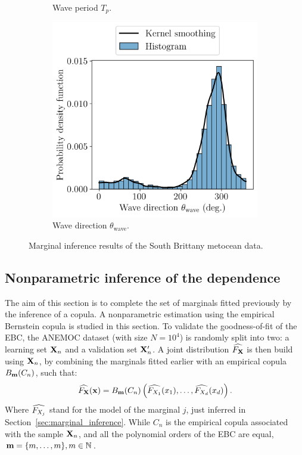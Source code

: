 \begin{figure}
\begin{subfigure}[b]{0.32\textwidth}
        \caption{Wave period $T_p$.}
    \end{subfigure}
    \begin{subfigure}[b]{0.32\textwidth}
        \centering
        \includegraphics[width=\linewidth]{../numerical_experiments/chapter3/figures/wave_dir_distribution_SB.png}
        \caption{Wave direction $\theta_{\mathrm{wave}}$.}
    \end{subfigure}
    \caption{Marginal inference results of the South Brittany metocean data.}
    \label{fig:marginals_sb}
\end{figure}

\newpage
\subsection{Nonparametric inference of the dependence}

The aim of this section is to complete the set of marginals fitted previously by the inference of a copula. 
A nonparametric estimation using the empirical Bernstein copula is studied in this section. 
To validate the goodness-of-fit of the EBC, the ANEMOC dataset (with size $N=10^4$) is randomly split into two:
a learning set ${\bf X}_n$ and a validation set ${\bf X}_n'$. 
A joint distribution $\widehat{F_{\bf X}}$ is then build using ${\bf X}_n$, by combining the marginals fitted earlier with an empirical copula $B_{{\bf m}}(C_n)$, such that: 
\begin{equation}
    \widehat{F_{\bf X}}({\bf x}) = B_{{\bf m}}(C_n)\left(\widehat{F_{X_1}}(x_1), \dots, \widehat{F_{X_d}}(x_d)\right).
\end{equation}
Where $\widehat{F_{X_j}}$ stand for the model of the marginal $j$, just inferred in Section~\ref{sec:marginal_inference}. 
While $C_n$ is the empirical copula associated with the sample ${\bf X}_n$, and all the polynomial orders of the EBC are equal, ${\bf m} = \{m, \dots, m\}, m\in\mathbb{N}$.

